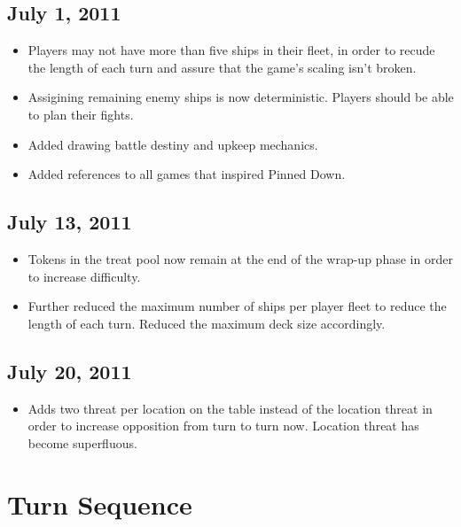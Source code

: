 \documentclass[11pt, a4paper]{article}
\begin{document}
\subsection{July 1, 2011}

\begin{itemize}
 \item Players may not have more than five ships in their fleet, in order to
recude the length of each turn and assure that the game's scaling isn't broken.
 \item Assigining remaining enemy ships is now deterministic. Players should be
able to plan their fights.
 \item Added drawing battle destiny and upkeep mechanics.
 \item Added references to all games that inspired Pinned Down.
\end{itemize}

\subsection{July 13, 2011}

\begin{itemize}
 \item Tokens in the treat pool now remain at the end of the wrap-up phase in
order to increase difficulty.
 \item Further reduced the maximum number of ships per player fleet to reduce
the length of each turn. Reduced the maximum deck size accordingly.
\end{itemize}

\subsection{July 20, 2011}

\begin{itemize}
 \item Adds two threat per location on the table instead of the location threat
in order to increase opposition from turn to turn now. Location threat has
become superfluous.
\end{itemize}

\newpage

\appendix

\section{Turn Sequence}
\end{document}
